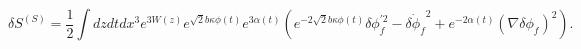 \begin{equation}
\delta S^{(S)}=\frac{1}{2}\int dz dt dx^3 e^{3 W(z)} e^{\sqrt{2} b \kappa \phi(t)}
e^{3 \alpha(t)}(e^{-2 \sqrt{2}b \kappa \phi(t)} \delta \phi_f^{'2}- \dot{\delta \phi_f}^2
+e^{-2 \alpha(t)} (\nabla \delta \phi_f)^2).
\end{equation}

